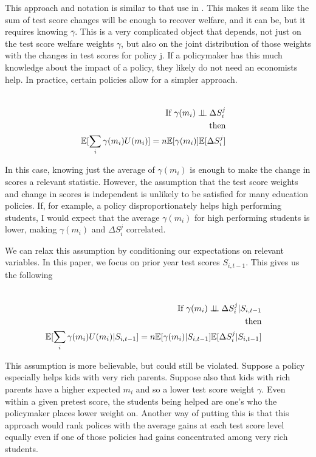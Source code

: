 \documentclass{article}
\theoremstyle{definition}
\theoremstyle{definition}
\theoremstyle{definition}
\begin{document}
  \normalsize 

This approach and notation is similar to that use in \cite{Keyser_2020}. This makes it seam like the sum of test score changes will be enough to recover welfare, and it can be, but it requires knowing $\bar{\gamma}$. This is a very complicated object that depends, not just on the test score welfare weights $\gamma$, but also on the joint distribution of those weights with the changes in test scores for policy j. If a policymaker has this much knowledge about the impact of a policy, they likely do not need an economists help. In practice, certain policies allow for a simpler approach. 

\large
\begin{align*}

   \\ \text{If  }   \gamma(m_i) \indep \Delta S_i^j &
    \\ \text{then} &
   \\ \E[\sum_i \gamma(m_i)U(m_i)]= n\E[\gamma(m_i)]\E[\Delta S_i^j] &
\end{align*}

\normalsize
In this case, knowing just the average of $\gamma(m_i)$ is enough to make the change in scores a relevant statistic. However, the assumption that the test score weights and change in scores is independent is unlikely to be satisfied for many education policies. If, for example, a policy disproportionately helps high performing students, I would expect that the average $\gamma(m_i)$ for high performing students is lower, making $\gamma(m_i)$  and $\Delta S_i^j$ correlated. 

We can relax this assumption by conditioning our expectations on relevant variables. In this paper, we focus on prior year test scores $S_{i,t-1}$. This gives us the following 

\large
\begin{align*}

   \\ \text{If  }   \gamma(m_i) \indep \Delta S_i^j | S_{i,t-1} &
    \\ \text{then} &
   \\ \E[\sum_i \gamma(m_i)U(m_i)| S_{i,t-1}]= n\E[\gamma(m_i)|S_{i,t-1}]\E[\Delta S_i^j|S_{i,t-1}] &
\end{align*}
\normalsize

This assumption is more believable, but could still be violated. Suppose a policy especially helps kids with very rich parents. Suppose also that kids with rich parents have a higher expected $m_i$ and so a lower test score weight $\gamma$. Even within a given pretest score, the students being helped are one's who the policymaker places lower weight on. Another way of putting this is that this approach would rank polices with the average gains at each test score level equally even if one of those policies had gains concentrated among very rich students. 
\end{document}
